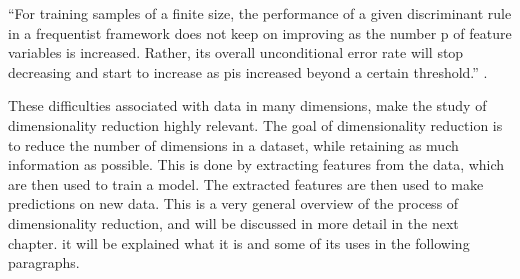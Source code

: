 “For training samples of a ﬁnite size, the performance of a given discriminant
rule in a frequentist framework does not keep on improving as the number p
of feature variables is increased. Rather, its overall unconditional error rate
will stop decreasing and start to increase as pis increased beyond a certain
threshold.” \cite{mclachlan2004s100}.

These difficulties associated with data in many dimensions, make the study of dimensionality reduction highly relevant. The goal of dimensionality reduction is to reduce the number of dimensions in a dataset, while retaining as much information as possible. This is done by extracting features from the data, which are then used to train a model. The extracted features are then used to make predictions on new data. This is a very general overview of the process of dimensionality reduction, and will be discussed in more detail in the next chapter.
it will be explained what it is and some of its uses in the following paragraphs.









